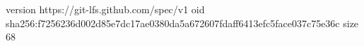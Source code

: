 version https://git-lfs.github.com/spec/v1
oid sha256:f7256236d002d85e7dc17ae0380da5a672607fdaff6413efc5face037c75e36c
size 68
